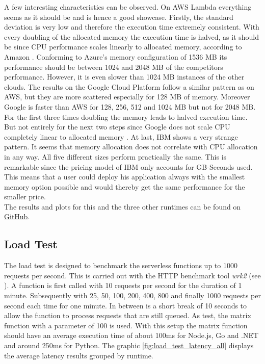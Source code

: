 A few interesting characteristics can be observed. On \gls{AWS} Lambda everything seems as it should be and is hence a good showcase. Firstly, the standard deviation is very low and therefore the execution time extremely consistent. With every doubling of the allocated memory the execution time is halved, as it should be since \gls{CPU} performance scales linearly to allocated memory, according to Amazon \cite{AWSLambdaConfig}. Conforming to Azure's memory configuration of 1536 \gls{MB} its performance should be between 1024 and 2048 \gls{MB} of the competitors performance. However, it is even slower than 1024 \gls{MB} instances of the other clouds. The results on the Google Cloud Platform follow a similar pattern as on \gls{AWS}, but they are more scattered especially for 128 \gls{MB} of memory. Moreover Google is faster than \gls{AWS} for 128, 256, 512 and 1024 \gls{MB} but not for 2048 \gls{MB}. For the first three times doubling the memory leads to halved execution time. But not entirely for the next two steps since Google does not scale \gls{CPU} completely linear to allocated memory \cite{GoogleFunctionsPricing}. At last, \gls{IBM} shows a very strange pattern. It seems that memory allocation does not correlate with \gls{CPU} allocation in any way. All five different sizes perform practically the same. This is remarkable since the pricing model of \gls{IBM} only accounts for GB-Seconds used. This means that a user could deploy his application always with the smallest memory option possible and would thereby get the same performance for the smaller price.\\
The results and plots for this and the three other runtimes can be found on \href{https://github.com/Bschitter/benchmark-suite-serverless-computing/tree/master/results/3-general}{GitHub}.

\subsection{Load Test}
\label{sec:loadtest}
The load test is designed to benchmark the serverless functions up to 1000 requests per second. This is carried out with the \gls{HTTP} benchmark tool \textit{wrk2} (see \cite{wrk2}). A function is first called with 10 requests per second for the duration of 1 minute. Subsequently with 25, 50, 100, 200, 400, 800 and finally 1000 requests per second each time for one minute. In between is a short break of 10 seconds to allow the function to process requests that are still queued. As test, the matrix function with a parameter of 100 is used. With this setup the matrix function should have an average execution time of about 100ms for Node.js, Go and .NET and around 250ms for Python. The graphic \ref{fig:load_test_latency_all} displays the average latency results grouped by runtime.

